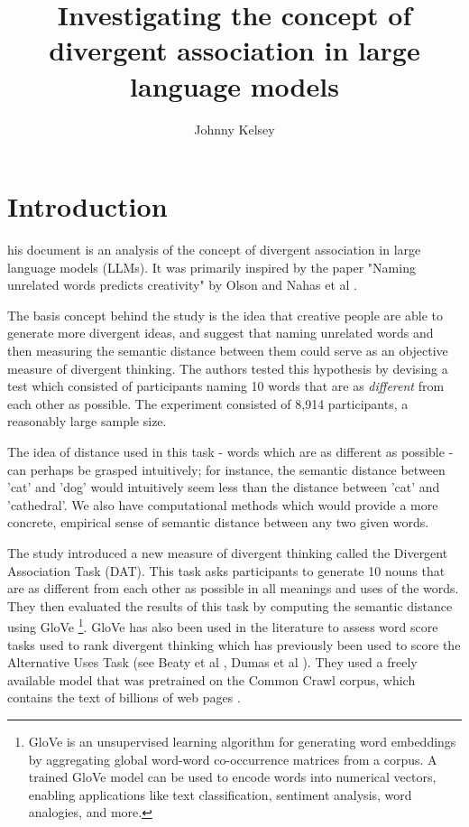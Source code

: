 \documentclass[9pt,a4paper,twoside]{rho-class/rho}
\title{Investigating the concept of divergent association in large language models}
\author[1,$\dagger$]{Johnny Kelsey}
\begin{document}
	
    \maketitle
    \thispagestyle{firststyle}
    \linenumbers


\section{Introduction}

    his document is an analysis of the concept of divergent association in large language models (LLMs). It was primarily inspired by the paper "Naming unrelated words predicts creativity"  by Olson and Nahas et al \cite{Olson_2021}. 

The basis concept behind the study is the idea that creative people are able to generate more divergent ideas, and suggest that naming unrelated words and then measuring the semantic distance between them could serve as an objective measure of divergent thinking. The authors tested this hypothesis by devising a test which consisted of participants naming 10 words that are as \emph{different} from each other as possible. The experiment consisted of 8,914 participants, a reasonably large sample size. 

The idea of distance used in this task - words which are as different as possible - can perhaps be grasped intuitively; for instance, the semantic distance between 'cat' and 'dog' would intuitively seem less than the distance between 'cat' and 'cathedral'. We also have computational methods which would provide a more concrete, empirical sense of semantic distance between any two given words. 

The study introduced a new measure of divergent thinking called the Divergent Association Task (DAT). This task asks participants to generate 10 nouns that are as different from each other as possible in all meanings and uses of the words. They then evaluated the results of this task by computing the semantic distance using GloVe \cite{Pennington_2014} \footnote{GloVe is an unsupervised learning algorithm for generating word embeddings by aggregating global word-word co-occurrence matrices from a corpus. A trained GloVe model can be used to encode words into numerical vectors, enabling applications like text classification, sentiment analysis, word analogies, and more.}.  GloVe has also been used in the literature to assess word score tasks used to rank divergent thinking which has previously been used to score the Alternative Uses Task (see Beaty et al  \cite{beaty2021automating}, Dumas et al \cite{dumas2021measuring}). They used a freely available model that was pretrained on the Common Crawl corpus, which contains the text of billions of web pages \cite{Pennington_2014}.
\end{document}
